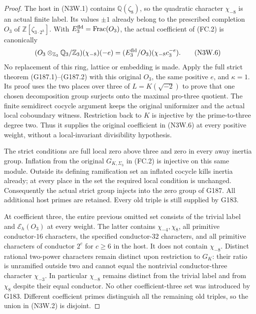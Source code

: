 \begin{proof}
The host in (N3W.1) contains $\mathbb Q(\zeta_8)$, so the quadratic
character $\chi_{-8}$ is an actual finite label. Its values $\pm1$
already belong to the prescribed completion $O_3$ of
$\mathbb Z[\zeta_{3\cdot2^h}]$. With $E_3^{\rm fld}=\operatorname{Frac}(O_3)$,
the actual coefficient of (FC.2) is canonically
\[
 (O_3\otimes_{\mathbb Z_3}\mathbb Q_3/\mathbb Z_3)
                   (\chi_{-8})(-e)
      =(E_3^{\rm fld}/O_3)(\chi_{-8}c_3^{-e}).
 \tag{N3W.6}
\]
No replacement of this ring, lattice or embedding is made.
Apply the full strict theorem (G187.1)--(G187.2) with this
original $O_3$, the same positive $e$, and $\kappa=1$.
Its proof uses the two places over three of
$L=K(\sqrt{-2})$ to prove that one chosen decomposition group
surjects onto the maximal pro-three quotient. The finite
semidirect cocycle argument keeps the original uniformizer and
the actual local coboundary witness. Restriction back to $K$
is injective by the prime-to-three degree two.
Thus it supplies the original coefficient in (N3W.6) at every
positive weight, without a local-invariant divisibility hypothesis.

The strict conditions are full local zero above three and zero
in every away inertia group. Inflation from the original
$G_{K,\Sigma_3}$ in (FC.2) is injective on this same module.
Outside its defining ramification set an inflated cocycle kills
inertia already; at every place in the set the required local
condition is unchanged. Consequently the actual strict group
injects into the zero group of G187. All additional host primes
are retained. Every old triple is still supplied by G183.

At coefficient three, the entire previous omitted set consists
of the trivial label and $\mathscr E_h(O_3)$ at every weight.
The latter contains $\chi_{-4},\chi_8$, all primitive conductor-$16$
characters, the specified conductor-$32$ characters, and all
primitive characters of conductor $2^c$ for $c\geq6$ in the host.
It does not contain $\chi_{-8}$.
Distinct rational two-power characters remain distinct upon
restriction to $G_K$: their ratio is unramified outside two and
cannot equal the nontrivial conductor-three character $\chi_{-3}$.
In particular $\chi_{-8}$ remains distinct from the trivial label
and from $\chi_8$ despite their equal conductor.
No other coefficient-three set was introduced by G183.
Different coefficient primes distinguish all the remaining old
triples, so the union in (N3W.2) is disjoint.


\end{proof}
